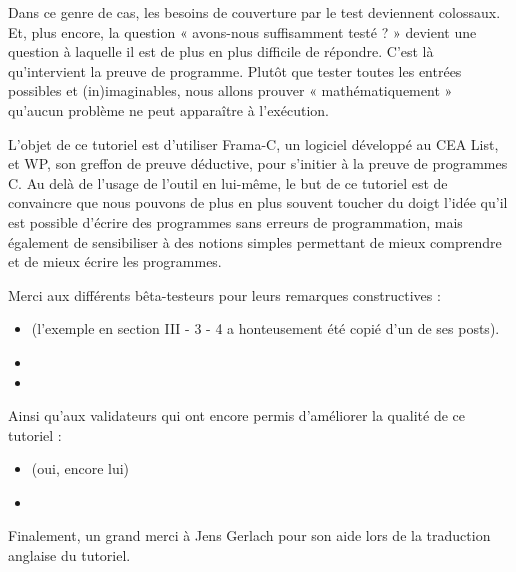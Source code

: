 Dans ce genre de cas, les besoins de couverture par le test deviennent 
colossaux. Et, plus encore, la question « avons-nous suffisamment testé ? » 
devient une question à laquelle il est de plus en plus difficile de répondre.
C'est là qu'intervient la preuve de programme. Plutôt que tester toutes les 
entrées possibles et (in)imaginables, nous allons prouver « mathématiquement »
qu'aucun problème ne peut apparaître à l'exécution.



L'objet de ce tutoriel est d'utiliser Frama-C, un logiciel développé au 
CEA List, et WP, son greffon de preuve déductive, pour s'initier à la preuve 
de programmes C. Au delà de l'usage de l'outil en lui-même, le but de ce tutoriel
est de convaincre que nous pouvons de plus en plus souvent toucher du 
doigt l'idée qu'il est possible d'écrire des programmes sans erreurs de 
programmation, mais également de sensibiliser à des notions simples 
permettant de mieux comprendre et de mieux écrire les programmes.



\begin{Information}
Merci aux différents bêta-testeurs pour leurs remarques constructives :

\begin{itemize}
\item {} (l'exemple en section 
III - 3 - 4 a honteusement été copié d'un de ses posts).
\item {}
\item {}
\end{itemize}
Ainsi qu'aux validateurs qui ont encore permis d'améliorer la qualité de ce tutoriel :

\begin{itemize}
\item {} (oui, encore lui)
\item {}
\end{itemize}
Finalement, un grand merci à Jens Gerlach pour son aide lors de la traduction
anglaise du tutoriel.
\end{Information}
